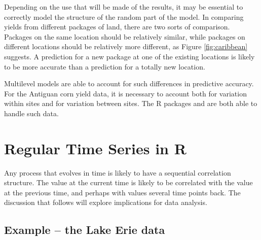 Depending on the use that will be made of the results, it may be
essential to correctly model the structure of the random part of the
model.  In comparing yields from different packages of land, there are
two sorts of comparison.  Packages on the same location should be
relatively similar, while packages on different locations should be
relatively more different, as Figure \ref{fig:caribbean} suggests.
A prediction for a new package at one of the existing locations is
likely to be more accurate than a prediction for a totally new
location.

  Multilevel
models are able to account for such differences in predictive
accuracy.  For the Antiguan corn yield data, it is necessary to
account both for variation within sites and for variation between
sites.  The R packages  and  are both able to
handle such data.

\section{Regular Time Series in R}\label{sec:ts}
\noindent
{}
\vspace*{15pt}

Any process that evolves in time is likely to have a
sequential correlation structure.  The value at the current
time is likely to be correlated with the value at the previous
time, and perhaps with values several time points back.
The discussion that follows will explore implications for data
analysis.

\subsection{Example -- the Lake Erie data}



